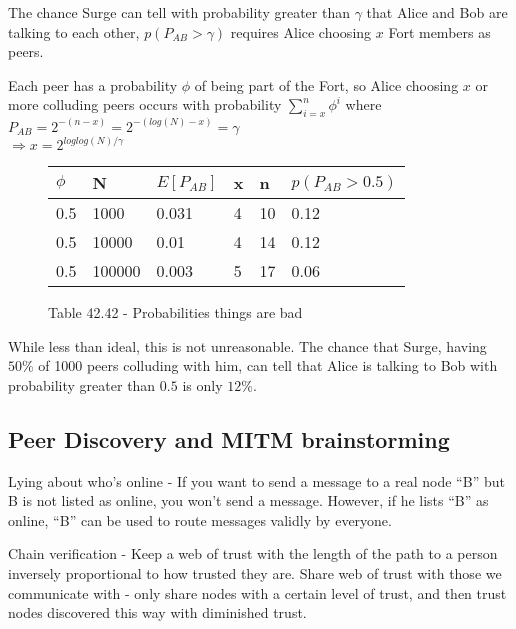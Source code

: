 \documentclass[twocolumn,11pt,english]{article}
\begin{document}
The chance Surge can tell with probability greater than $\gamma$ that Alice and Bob are talking to each other, $p(P_{AB} > \gamma)$ requires Alice choosing $x$ Fort members as peers. 

Each peer has a probability $\phi$ of being part of the Fort, so Alice choosing $x$ or more colluding peers occurs with probability $\sum\limits_{i=x}^n\phi^i$ where 
\\ $P_{AB} = 2^{-(n - x)} = 2^{-(log(N) - x)} = \gamma$
\\ $ \Rightarrow x = 2^{loglog(N)/\gamma}$

\begin{figure}[ht]
  \begin{tabular}{| l | l | l | l | l | l |}
    \hline
    $\phi$ & N & $E[P_{AB}]$ & x & n & $p(P_{AB} > 0.5)$ \\\hline
    0.5 & 1000 & 0.031 & 4 & 10 & 0.12\\
    0.5 & 10000 & 0.01 & 4 & 14 & 0.12\\
    0.5 & 100000 & 0.003 & 5 & 17 & 0.06\\
    \hline
  \end{tabular}
  \caption{Table 42.42 - Probabilities things are bad}
\end{figure}

While less than ideal, this is not unreasonable. The chance that Surge, having $50\%$ of 1000 peers colluding with him, can tell that Alice is talking to Bob with probability greater than $0.5$ is only $12\%$. 

\begin{comment}
  TODO: Apply PIR to obtain security guarantees even when $R \subset S$
\end{comment}

\subsection{Peer Discovery and MITM brainstorming}

Lying about who's online - If you want to send a message to a real node ``B'' but B is not listed as online, you won't send a message. However, if he lists ``B'' as online, ``B'' can be used to route messages validly by everyone. 

Chain verification - Keep a web of trust with the length of the path to a person inversely proportional to how trusted they are. Share web of trust with those we communicate with - only share nodes with a certain level of trust, and then trust nodes discovered this way with diminished trust. 
\end{document}
